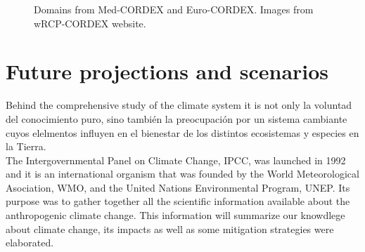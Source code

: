 \begin{figure}[!tbp]
  \centering
  \hfill
  \caption{Domains from Med-CORDEX and Euro-CORDEX. Images from wRCP-CORDEX website.}
\end{figure}


\section{Future projections and scenarios}

Behind the comprehensive study of the climate system it is not only la voluntad del conocimiento puro, sino también la preocupación por un sistema cambiante cuyos elelmentos influyen en el bienestar de los distintos ecosistemas y especies en la Tierra.\\

The Intergovernmental Panel on Climate Change, IPCC, was launched in 1992 and it is an international organism that was founded by the World Meteorological Asociation, WMO, and the United Nations Environmental Program, UNEP. Its purpose was to gather together all the scientific information available about the anthropogenic climate change. This information will summarize our knowdlege about climate change, its impacts as well as some mitigation strategies were elaborated.\\

